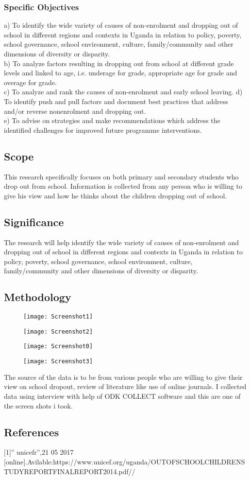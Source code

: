 \documentclass[12pt,letterpaper]{article}
\begin{document}
\subsubsection{Specific Objectives}
a) To identify the wide variety of causes of non-enrolment and dropping out of school in different regions and contexts in Uganda in relation to policy, poverty, school governance, school environment, culture, family/community and other dimensions of diversity or disparity.\\
b) To analyze factors resulting in dropping out from school at different grade levels and linked to age, i.e. underage for grade, appropriate age for grade and overage for grade.\\
c) To analyze and rank the causes of non-enrolment and early school leaving.
d) To identify push and pull factors and document best practices that address and/or reverse nonenrolment and dropping out.\\
e) To advise on strategies and make recommendations which address the identified challenges for improved future programme interventions.\\ 
 \subsection{Scope}
 This research specifically focuses on both primary and secondary students who drop out from school. Information is collected from any person who is willing to give his view and how he thinks about the children dropping out of school.
 \subsection{Significance}
   The research will help identify the wide variety of causes of non-enrolment and dropping out of school in different regions and contexts in Uganda in relation to policy, poverty, school governance, school environment, culture, family/community and other dimensions of diversity or disparity.
 \subsection{ Methodology}
  
 \begin{figure}[h]
 	\texttt{[image: Screenshot1]}
 \end{figure}
 \begin{figure}[h]	
	\texttt{[image: Screenshot2]}
\end{figure}
\begin{figure}[h]
	\texttt{[image: Screenshot0]}
\end{figure}
 \begin{figure}[h]
	\texttt{[image: Screenshot3]}
\end{figure}
  The source of the data is to be from various people who are willing to give their view on school dropout, review of literature like use of online journals.
  I collected data using interview with help of ODK COLLECT software and this are one of the screen shots i took.
  
 
\subsection{References}
[1]” unicefr”,21 05 2017
[online].Avilable:https://www.unicef.org/uganda/OUTOFSCHOOLCHILDRENSTUDYREPORTFINALREPORT2014.pdf//
\end{document}

